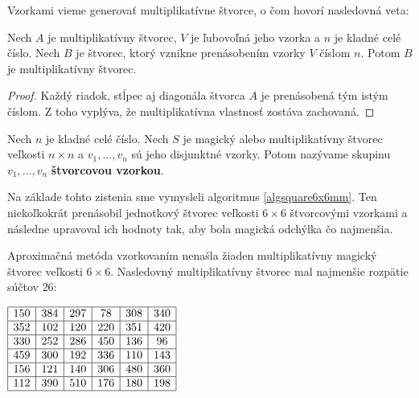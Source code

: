 Vzorkami vieme generovať multiplikatívne štvorce, o čom hovorí nasledovná veta:

\begin{theorem}
\label{addmultsquarepattern}
Nech $A$ je multiplikatívny štvorec, $V$ je ľubovoľná jeho vzorka a $n$ je kladné celé číslo. Nech $B$ je štvorec, ktorý vznikne prenásobením vzorky $V$ číslom $n$. Potom $B$ je multiplikatívny štvorec.
\end{theorem}

\begin{proof} Každý riadok, stĺpec aj diagonála štvorca $A$ je prenásobená tým istým číslom. Z toho vyplýva, že multiplikatívna vlastnosť zostáva zachovaná.
\end{proof}

\begin{definition} Nech $n$ je kladné celé číslo. Nech $S$ je magický alebo multiplikatívny štvorec veľkosti $n \times n$ a $v_1, \dots , v_n$ sú jeho disjunktné vzorky. Potom nazývame skupinu $v_1, \dots , v_n$ \textbf{štvorcovou vzorkou}.
\end{definition}

Na základe tohto zistenia sme vymysleli algoritmus \ref{algsquare6x6mm}. Ten niekoľkokrát prenásobil jednotkový štvorec veľkosti $6 \times 6$ štvorcovými vzorkami a následne upravoval ich hodnoty tak, aby bola magická odchýlka čo najmenšia.

\begin{result} Aproximačná metóda vzorkovaním nenašla žiaden multiplikatívny magický štvorec veľkosti $6 \times 6$. Nasledovný multiplikatívny štvorec mal najmenšie rozpätie súčtov $26$:
\end{result}

\begin{center}
$\begin{array}{ |c|c|c|c|c|c| } 
\hline
150 & 384 & 297 & 78 & 308 & 340 \\ 
\hline
352 & 102 & 120 & 220 & 351 & 420 \\ 
\hline
330 & 252 & 286 & 450 & 136 & 96 \\ 
\hline
459 & 300 & 192 & 336 & 110 & 143 \\ 
\hline
156 & 121 & 140 & 306 & 480 & 360 \\ 
\hline
112 & 390 & 510 & 176 & 180 & 198 \\ 
\hline
\end{array}$
\end{center}

